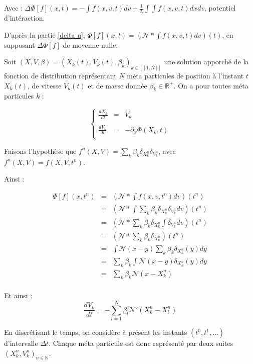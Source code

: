 \documentclass[a4paper,11pt]{article}
\begin{document}
Avec : $\Delta \Phi [f](x,t) =  - \int f(x,v,t) dv +  \frac{1}{L} \int \int f(x, v , t) dx dv$, potentiel d'intéraction.

D'après la partie \ref{delta u}, $\Phi[f](x,t) = (\mathcal{N} \ast \int f(x,v,t)dv) (t)$, en supposant $\Delta \Phi [f]$ de moyenne nulle.

Soit $(X,V, \beta) = (X_k(t),V_k(t), \beta_k)_{k \in [\![ 1, N]\!]}$ une solution apporché de la fonction de distribution représentant $N$ méta particules de position à l'instant $t$ $X_k(t)$, de vitesse $V_k(t)$ et de masse donnée $\beta_k \in \mathbb{R^+}$. On a pour toutes méta particules $k$ :

$$
\left\lbrace
\begin{array}{rcl}

\frac{dX_k}{dt} &=& V_k \\ \\
\frac{dV_k}{dt} &=& - \partial_x \Phi(X_k, t) \\

\end{array} \right.
$$

Faisons l'hypothèse que $f^n(X,V) = \sum\limits_k \beta_k \delta_{X_k^n} \delta_{ V_k^n}$, avec $f^n(X,V) = f(X,V, t^n)$.

Ainsi :

$$
\begin{array}{rcl}

\Phi[f](x,t^n) &=& (\mathcal{N} \ast \int f(x,v,t^n)dv) (t^n) \\
	&=&  (\mathcal{N} \ast \int \sum\limits_k \beta_k \delta_{X_k^n} \delta_{ V_k^n}dv) (t^n) \\
	&=& (\mathcal{N} \ast \sum\limits_k \beta_k \delta_{X_k^n} \int \delta_{ V_k^n}dv) (t^n) \\
	&=& (\mathcal{N} \ast \sum\limits_k \beta_k \delta_{X_k^n}) (t^n) \\
	&=& \int \mathcal{N}(x-y) \sum\limits_k \beta_k \delta_{X_k^n}(y) dy \\
	&=& \sum\limits_k \beta_k  \int \mathcal{N}(x-y) \delta_{X_k^n}(y) dy \\
	&=& \sum\limits_k \beta_k  \mathcal{N}(x-X_k^n) \\

\end{array}
$$

Et ainsi : 
$$
\boxed{\frac{d V_k} {dt} = -\sum\limits_{l=1}^N \beta_l  \mathcal{N}'(X_k^n-X_l^n)}
$$

En discrétisant le temps, on considère à présent les instants $(t^0, t^1, \dots)$ d'intervalle $\Delta t$. Chaque méta particule est donc représenté par deux suites $(X_k^n, V_k^n)_{n \in \mathbb{N}}$.
\end{document}
